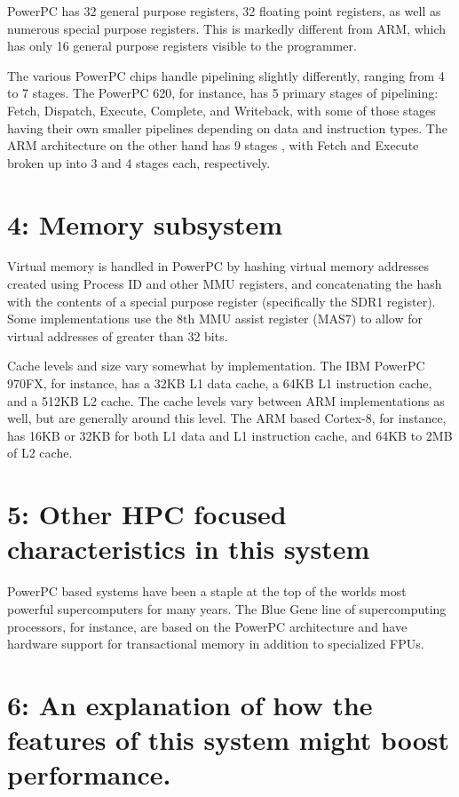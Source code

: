 \documentclass{article}
\begin{document}
PowerPC has 32 general purpose registers, 32 floating point registers, as well
as numerous special purpose registers. \cite{6} This is markedly different from
ARM, which has only 16 general purpose registers visible to the programmer. \cite{3}

The various PowerPC chips handle pipelining slightly differently, ranging from
4 to 7 stages. \cite{7} The PowerPC 620, for instance, has 5 primary stages of
pipelining: Fetch, Dispatch, Execute, Complete, and Writeback, \cite{8} with some
of those stages having their own smaller pipelines depending on data and
instruction types. The ARM architecture on the
other hand has 9 stages \cite{9}, with Fetch and
Execute broken up into 3 and 4 stages each, respectively.

\section*{4: Memory subsystem}

Virtual memory is handled in PowerPC by hashing virtual memory addresses
created using Process ID and other MMU registers, and
concatenating the hash with the contents of a special purpose register
(specifically the SDR1 register). \cite{10} Some implementations use the 8th MMU
assist register (MAS7) to allow for virtual addresses of greater than 32 bits. 

Cache levels and size vary somewhat by implementation. The IBM PowerPC 970FX,
for instance, has a 32KB L1 data cache, a 64KB L1 instruction cache, and a
512KB L2 cache. \cite{11} The cache levels vary between ARM implementations as
well, but are generally around this level. The ARM based Cortex-8, for
instance, has 16KB or 32KB for both L1 data and L1 instruction cache, and 64KB
to 2MB of L2 cache. \cite{12}

\section*{5: Other HPC focused characteristics in this system}

PowerPC based systems have been a staple at the top of the worlds most
powerful supercomputers for many years. \cite{13} The Blue Gene line of
supercomputing processors, for instance, are based on the PowerPC architecture
and have hardware support for transactional memory in addition to specialized
FPUs. \cite{14}

\section*{6: An explanation of how the features of this system might boost performance.}
\end{document}
